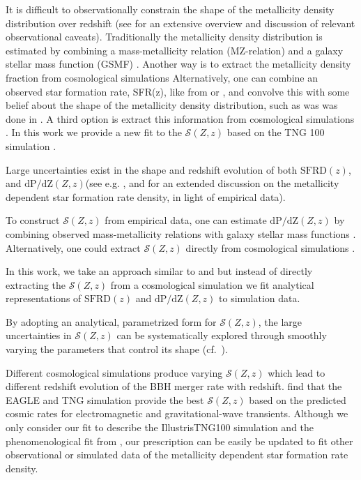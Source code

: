 \documentclass[twocolumn]{aastex631}
\newcommand{\SFRDzZ}{\ensuremath{\mathcal{S}(Z,z)}\xspace}
\newcommand{\SFRDz}{\ensuremath{\mathrm{SFRD}(z)}\xspace}
\newcommand{\dpdZ}{\ensuremath{\mathrm{dP/dZ}(Z,z)}\xspace}
\begin{document}
It is difficult to observationally constrain the shape of the metallicity density distribution over redshift (see \cite{Chruslinska2019_obs} for an extensive overview and discussion of relevant observational caveats). Traditionally the metallicity density distribution is estimated by combining a mass-metallicity relation (MZ-relation) and a galaxy stellar mass function (GSMF) \citep[see also][]{Chruslinska+2018, Chruslinska2019_effectCO, Broekgaarden+2021a}.
Another way is to extract the metallicity density fraction from cosmological simulations \citep[e.g.]{Mapelli2017, Schneider+2017}
Alternatively, one can combine an observed star formation rate, SFR(z), like from \cite{MadauDickinson2014} or \cite{Madau+2017}, and convolve this with some belief about the shape of the metallicity density distribution, such as was was done in \cite{Neijssel+2019}.
A third option is extract this information from cosmological simulations \citep[e.g.][]{Mapelli+2017,Schneider+2017}.
In this work we provide a new fit to the \SFRDzZ based on the TNG 100 simulation \citep{Pillepich2018, Weinberger2017}.

Large uncertainties exist in the shape and redshift evolution of both \SFRDz, and  \dpdZ (see e.g. \citealt{Chruslinska2019_obs}, \citealt{Boco2021} and \citealt{Chruslinska+2021} for an extended discussion on the metallicity dependent star formation rate density, in light of empirical data).

To construct \SFRDzZ from empirical data, one can estimate \dpdZ by combining observed mass-metallicity relations with galaxy stellar mass functions \citep[see e.g.][]{Chruslinska+2018, Chruslinska2019_obs, Broekgaarden+2021b}. Alternatively, one could extract \SFRDzZ directly from cosmological simulations \citep[e.g.][]{Mapelli2017, Briel+2021}. 

In this work, we take an approach similar to \citet{Mapelli2017} and \cite{Briel+2021}  but instead of directly extracting the \SFRDzZ from a cosmological simulation we fit analytical representations of \SFRDz and \dpdZ to simulation data.

By adopting an analytical, parametrized form for \SFRDzZ, the large uncertainties in \SFRDzZ can be systematically explored through smoothly varying the parameters that control its shape (cf.~\citealt{Briel+2021}). 


Different cosmological simulations produce varying \SFRDzZ which lead to different redshift evolution of the BBH merger rate with redshift. \cite{Briel+2021} find that the EAGLE and TNG simulation provide the best \SFRDzZ based on the predicted cosmic rates for electromagnetic and gravitational-wave transients. 
Although we only consider our fit to describe the IllustrisTNG100 simulation and the phenomenological fit from \cite{Neijssel+2019}, our prescription can be easily be updated to fit other observational or simulated data of the metallicity dependent star formation rate density.
\end{document}
